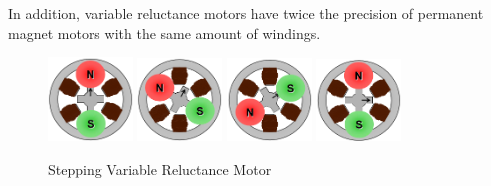 In addition, variable reluctance motors have twice the precision of permanent magnet motors with 
the same amount of windings.
\begin{figure}[htp]
    \begin{center}
    \includegraphics[width=0.2\textwidth]{figures/move/motor19.png}
    \hfill
    \includegraphics[width=0.2\textwidth]{figures/move/motor20.png}
    \hfill
    \includegraphics[width=0.2\textwidth]{figures/move/motor21.png}
  	\hfill
  	\includegraphics[width=0.2\textwidth]{figures/move/motor22.png}
	\end{center}
	\begin{center}
    \hfill
    \hfill
  	\hfill
  	\caption{Stepping Variable Reluctance Motor}
  	\label{fig:stepping_var_rel}
  	\end{center}
\end{figure}
\newpage
